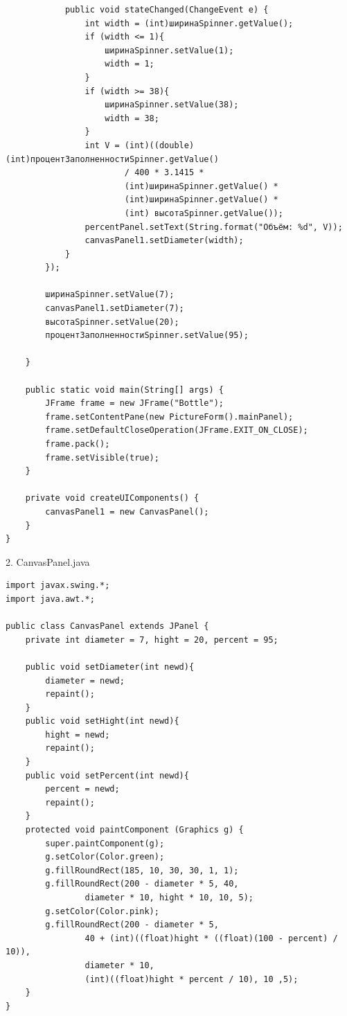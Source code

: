 ﻿\documentclass[a4paper, 12pt]{extarticle}
\begin{document}
\begin{verbatim}
            public void stateChanged(ChangeEvent e) {
                int width = (int)ширинаSpinner.getValue();
                if (width <= 1){
                    ширинаSpinner.setValue(1);
                    width = 1;
                }
                if (width >= 38){
                    ширинаSpinner.setValue(38);
                    width = 38;
                }
                int V = (int)((double) (int)процентЗаполненностиSpinner.getValue()
                        / 400 * 3.1415 *
                        (int)ширинаSpinner.getValue() *
                        (int)ширинаSpinner.getValue() *
                        (int) высотаSpinner.getValue());
                percentPanel.setText(String.format("Объём: %d", V));
                canvasPanel1.setDiameter(width);
            }
        });

        ширинаSpinner.setValue(7);
        canvasPanel1.setDiameter(7);
        высотаSpinner.setValue(20);
        процентЗаполненностиSpinner.setValue(95);

    }

    public static void main(String[] args) {
        JFrame frame = new JFrame("Bottle");
        frame.setContentPane(new PictureForm().mainPanel);
        frame.setDefaultCloseOperation(JFrame.EXIT_ON_CLOSE);
        frame.pack();
        frame.setVisible(true);
    }

    private void createUIComponents() {
        canvasPanel1 = new CanvasPanel();
    }
}
\end{verbatim}
2. CanvasPanel.java
\begin{verbatim}
import javax.swing.*;
import java.awt.*;

public class CanvasPanel extends JPanel {
    private int diameter = 7, hight = 20, percent = 95;

    public void setDiameter(int newd){
        diameter = newd;
        repaint();
    }
    public void setHight(int newd){
        hight = newd;
        repaint();
    }
    public void setPercent(int newd){
        percent = newd;
        repaint();
    }
    protected void paintComponent (Graphics g) {
        super.paintComponent(g);
        g.setColor(Color.green);
        g.fillRoundRect(185, 10, 30, 30, 1, 1);
        g.fillRoundRect(200 - diameter * 5, 40,
                diameter * 10, hight * 10, 10, 5);
        g.setColor(Color.pink);
        g.fillRoundRect(200 - diameter * 5,
                40 + (int)((float)hight * ((float)(100 - percent) / 10)),
                diameter * 10,
                (int)((float)hight * percent / 10), 10 ,5);
    }
}
\end{verbatim}
\end{document}
